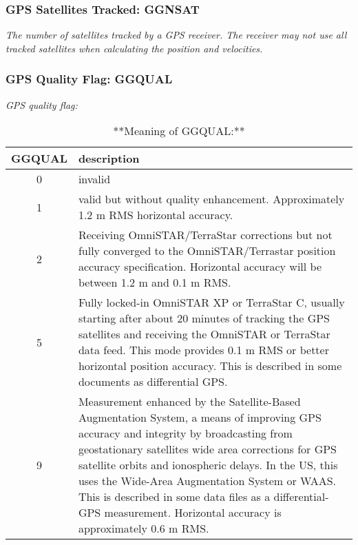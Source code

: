\documentclass[
  english,
]{book}
\begin{document}
\hypertarget{ggnsat}{%
\subsubsection*{GPS Satellites Tracked: GGNSAT}\label{ggnsat}}

\emph{The number of satellites tracked by a GPS receiver. The receiver
may not use all tracked satellites when calculating the position and
velocities.}

\hypertarget{ggqual}{%
\subsubsection*{GPS Quality Flag: GGQUAL}\label{ggqual}}

\emph{GPS quality flag:}

\begin{table}

\caption{\label{tab:unnamed-chunk-34}**Meaning of GGQUAL:**}
\centering
\begin{tabular}[t]{c|l}
\hline
GGQUAL & description\\
\hline
0 & invalid\\
\hline
1 & valid but without quality enhancement. Approximately 1.2 m RMS horizontal accuracy.\\
\hline
2 & Receiving OmniSTAR/TerraStar corrections but not fully converged to the OmniSTAR/Terrastar position accuracy specification. Horizontal accuracy will be between 1.2 m and 0.1 m RMS.\\
\hline
5 & Fully locked-in OmniSTAR XP or TerraStar C, usually starting after about 20 minutes of tracking the GPS satellites and receiving the OmniSTAR or TerraStar data feed. This mode provides 0.1 m RMS or better horizontal position accuracy. This is described in some documents as differential GPS.\\
\hline
9 & Measurement enhanced by the Satellite-Based Augmentation System, a means of improving GPS accuracy and integrity by broadcasting from geostationary satellites wide area corrections for GPS satellite orbits and ionospheric delays. In the US, this uses the Wide-Area Augmentation System or WAAS. This is described in some data files as a differential-GPS measurement. Horizontal accuracy is approximately 0.6 m RMS.\\
\hline
\end{tabular}
\end{table}
\end{document}
